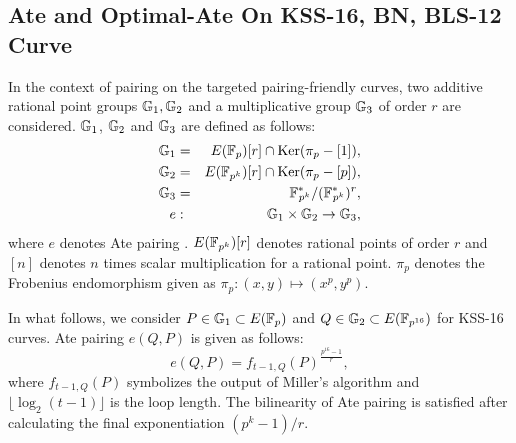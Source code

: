\subsection{Ate and Optimal-Ate On KSS-16, BN, BLS-12 Curve}
\label{sec:ch:indo:optate_ksss16}

In the context of pairing on the targeted pairing-friendly curves, two additive rational point groups ${\mathbb{G}}_{1}, {\mathbb{G}}_{2}$ and a multiplicative group ${\mathbb{G}}_{3}$ of order $r$ are considered. 
${\mathbb{G}}_{1}$, ${\mathbb{G}}_{2}$ and ${\mathbb{G}}_{3}$ are defined as follows:
\begin{eqnarray}
{\mathbb{G}}_{1} & = &  E(\mathbb{F}_p) [r] \cap \text{Ker}(\pi_p - [1]), \nonumber \\
{\mathbb{G}}_{2} & = &  E({\mathbb{F}}_{p^{k}}) [r] \cap \text{Ker}(\pi_p - [p]), \nonumber \\
{\mathbb{G}}_{3} & = & {{\mathbb{F}}^{\ast}}_{\!\!\!p^{k}}/({{\mathbb{F}}^{\ast}}_{\!\!\!p^{k}})^r, \nonumber \\
 e & : &{\mathbb{G}}_{1} \times {\mathbb{G}}_{2} \rightarrow {\mathbb{G}}_{3},
\end{eqnarray}
where $e$ denotes Ate pairing \cite{DBLP:reference/crc/2005ehcc}. $E({\mathbb{F}}_{p^{k}})[r]$ denotes rational points of order $r$ and $[n]$ denotes $n$ times scalar multiplication for a rational point. 
$\pi_p$ denotes the Frobenius endomorphism given as $\pi_p: (x,y) \mapsto (x^p,y^p)$.

In what follows, we consider $P \in {\mathbb{G}}_{1} \subset E(\mathbb{F}_p)$ and  $Q \in {\mathbb{G}}_{2} \subset  E(\mathbb{F}_{p^{16}})$ for KSS-16 curves.
Ate pairing $e(Q,P)$ is given as follows:
\begin{equation}
	e(Q,P)=f_{t-1,Q}(P)^{\frac{p^{16}-1}{r}},
\end{equation}
where $f_{t-1,Q}(P)$ symbolizes the output of Miller's algorithm and $\lfloor \log_2 (t-1) \rfloor$ is the loop length. The bilinearity of Ate pairing is satisfied after calculating the final exponentiation $(p^k-1)/r$.

